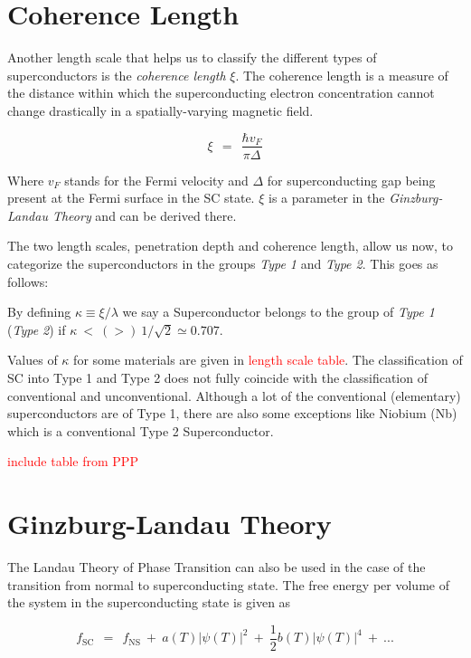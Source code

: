 \documentclass[10pt]{report}
\numberwithin{equation}{chapter}
\begin{document}
\section{Coherence Length}

Another length scale that helps us to classify the different types of superconductors is the \textit{coherence length} $\xi$. The coherence length is a measure of the distance within which the superconducting electron concentration cannot change drastically in a spatially-varying magnetic field.

\begin{equation} \label{eq:coherence_length}
  \xi ~~=~~ \frac{\hbar v_F}{\pi \Delta}
\end{equation}

Where $v_F$ stands for the Fermi velocity and $\Delta$ for superconducting gap being present at the Fermi surface in the SC state. $\xi$ is a parameter in the \textit{Ginzburg-Landau Theory} and can be derived there.

The two length scales, penetration depth and coherence length, allow us now, to categorize the superconductors in the groups \textit{Type 1} and \textit{Type 2}. This goes as follows:

By defining $\kappa \equiv \xi/\lambda$ we say a Superconductor belongs to the group of \textit{Type 1} (\textit{Type 2}) if $\kappa ~<~ (>)~ 1/\sqrt{2} \simeq 0.707 $. 

Values of $\kappa$ for some materials are given in \textcolor{red}{length scale table}. The classification of SC into Type 1 and Type 2 does not fully coincide with the classification of conventional and unconventional. Although a lot of the conventional (elementary) superconductors are of Type 1, there are also some exceptions like Niobium (Nb) which is a conventional Type 2 Superconductor.

\textcolor{red}{include table from PPP}


\section{Ginzburg-Landau Theory}

The Landau Theory of Phase Transition can also be used in the case of the transition from normal to superconducting state. The free energy per volume of the system in the superconducting state is given as

\begin{equation} \label{eq:f_SC}
  f_\text{SC} ~~=~~ f_\text{NS} ~+~ a(T) |\psi(T)|^2 ~+~ \frac{1}{2} b(T) |\psi(T)|^4 ~+~ ...
\end{equation}
\end{document}
